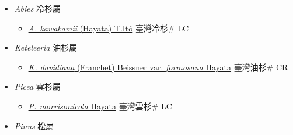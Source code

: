 
  \begin{itemize}
 \item[] \textit{Abies} 冷杉屬
                    
  \begin{itemize}
        \item[] \href{http://www.theplantlist.org/tpl1.1/search?q=Abies+kawakamii}{\textit{A. kawakamii} (Hayata) T.Itô}   臺灣冷杉\# LC
  \end{itemize}
 \item[] \textit{Keteleeria} 油杉屬
                    
  \begin{itemize}
        \item[] \href{http://www.theplantlist.org/tpl1.1/search?q=Keteleeria+davidiana+var.+formosana}{\textit{K. davidiana} (Franchet) Beissner var. \textit{formosana} Hayata}   臺灣油杉\# CR
  \end{itemize}
 \item[] \textit{Picea} 雲杉屬
                    
  \begin{itemize}
        \item[] \href{http://www.theplantlist.org/tpl1.1/search?q=Picea+morrisonicola}{\textit{P. morrisonicola} Hayata}   臺灣雲杉\# LC
  \end{itemize}
 \item[] \textit{Pinus} 松屬
                    

\end{itemize}

